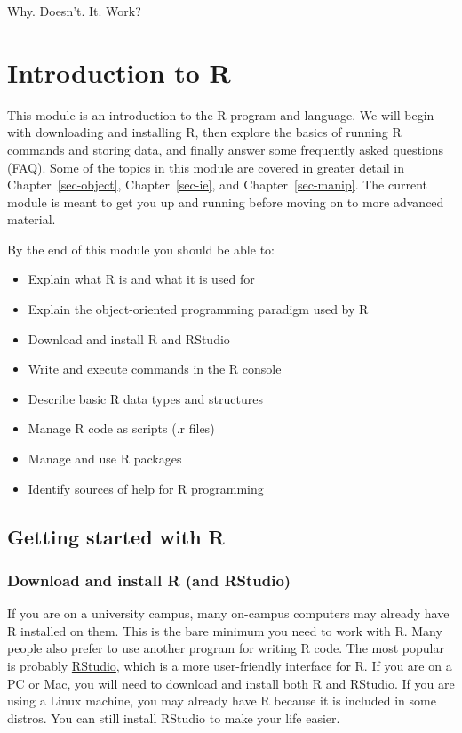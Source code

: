 \documentclass[
  13,
  letterpaper,
]{report}
\providecommand{\tightlist}{%
  \setlength{\itemsep}{0pt}\setlength{\parskip}{0pt}}
\begin{document}
Why. Doesn't. It. Work?

\chapter{Introduction to R}\label{sec-r}

This module is an introduction to the R program and language. We will
begin with downloading and installing R, then explore the basics of
running R commands and storing data, and finally answer some frequently
asked questions (FAQ). Some of the topics in this module are covered in
greater detail in Chapter~\ref{sec-object}, Chapter~\ref{sec-ie}, and
Chapter~\ref{sec-manip}. The current module is meant to get you up and
running before moving on to more advanced material.

By the end of this module you should be able to:

\begin{itemize}
\tightlist
\item
  Explain what R is and what it is used for
\item
  Explain the object-oriented programming paradigm used by R
\item
  Download and install R and RStudio
\item
  Write and execute commands in the R console
\item
  Describe basic R data types and structures
\item
  Manage R code as scripts (.r files)
\item
  Manage and use R packages
\item
  Identify sources of help for R programming
\end{itemize}

\section{Getting started with R}\label{sec-r-start}

\subsection{Download and install R (and
RStudio)}\label{sec-r-start-install}

If you are on a university campus, many on-campus computers may already
have R installed on them. This is the bare minimum you need to work with
R. Many people also prefer to use another program for writing R code.
The most popular is probably \href{https://posit.co/downloads}{RStudio},
which is a more user-friendly interface for R. If you are on a PC or
Mac, you will need to download and install both R and RStudio. If you
are using a Linux machine, you may already have R because it is included
in some distros. You can still install RStudio to make your life easier.
\end{document}
